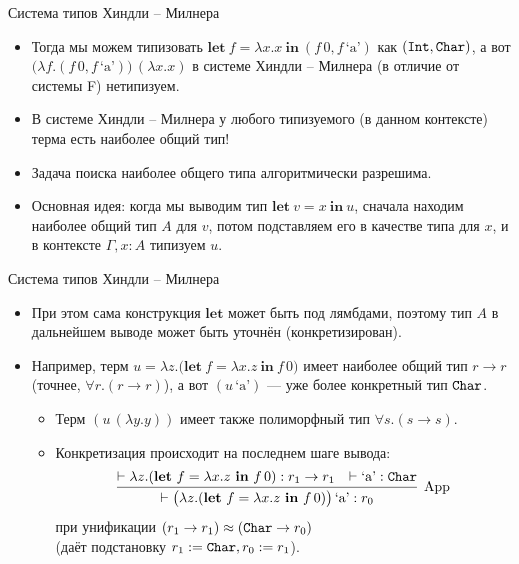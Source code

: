 \documentclass[xcolor=dvipsnames]{beamer}
\newcommand{\letin}[2]{\mathbf{let}\ {#1}\ \mathbf{in}\ {#2}}
\newcommand{\Int}{\mbox{\texttt{Int}}}
\newcommand{\Char}{\mbox{\texttt{Char}}}
\begin{document}
\begin{frame}{Система типов Хиндли -- Милнера}

\begin{itemize}
 \item Тогда мы можем типизовать $\letin{f = \lambda x . x}{(f\,0, f\,\mbox{`a'})}$ как $(\Int,\Char)$, а вот $\bigl( \lambda f . (f\,0, f\,\mbox{`a'}) \bigr) \, (\lambda x. x)$ в системе Хиндли -- Милнера (в отличие от системы F) нетипизуем.
 \item В системе Хиндли -- Милнера у любого типизуемого (в данном контексте) терма есть наиболее общий тип!
 \item Задача поиска наиболее общего типа алгоритмически разрешима.
 \item Основная идея: когда мы выводим тип $\letin{v=x}{u}$, сначала находим наиболее общий тип $A$ для $v$, потом подставляем его в качестве типа для $x$, и в контексте $\Gamma, x:A$ типизуем $u$.
\end{itemize}

 
\end{frame}

\begin{frame}{Система типов Хиндли -- Милнера}

\begin{itemize}[<+->]
 \item При этом сама конструкция $\mathbf{let}$ может быть под лямбдами, поэтому тип $A$ в дальнейшем выводе может быть уточнён (конкретизирован).
 \item Например, терм $u = \lambda z . \bigl( \letin{f = \lambda x. z}{f\,0} \bigr)$ имеет наиболее общий тип $r \to r$ (точнее, $\forall r. (r \to r)$), а вот $(u \, \mbox{`a'})$ --- уже более конкретный тип $\Char$.
 \begin{itemize}
 \item Терм $(u \, (\lambda y.y))$ имеет также полиморфный тип $\forall s. (s \to s)$.
 \item Конкретизация происходит на последнем шаге вывода:
 \[
  \infer[\mathrm{App}]
  {\vdash \bigl( \lambda z. (\letin{f=\lambda x.z}{f \, 0}) \bigr) \, \mbox{`a'} : r_0}
  {\vdash \lambda z. (\letin{f=\lambda x.z}{f \, 0}) : r_1 \to r_1 & \vdash \mbox{`a'} : \Char}
 \]
 при унификации $(r_1 \to r_1) \approx (\Char \to r_0)$ \\(даёт подстановку $r_1 := \Char, r_0 := r_1$).
 \end{itemize}

 \end{itemize}

 
\end{frame}
\end{document}
